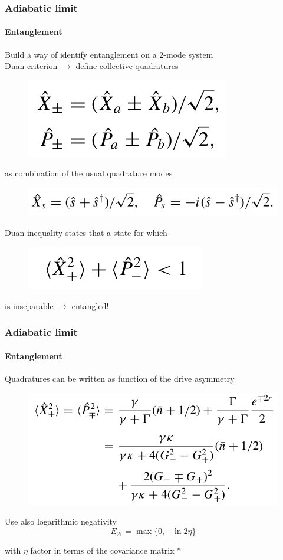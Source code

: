 \documentclass[aspectratio=43]{beamer}
\begin{document}
\begin{frame}
	
	\frametitle{Adiabatic limit}
	\framesubtitle{Entanglement}
	
	Build a way of identify entanglement on a 2-mode system\\
	Duan criterion $\longrightarrow$ define collective quadratures
	\begin{figure}
		\includegraphics[width = 4 cm]{plots/entanglement_quad.png}
	\end{figure}	
	
	as combination of the usual quadrature modes
	\begin{figure}
		\includegraphics[width = 7 cm]{plots/entanglement_quad_2.png}
	\end{figure}

	Duan inequality states that a state for which
	\begin{figure}
		\includegraphics[width = 3.5 cm]{plots/entanglement_duan_criterion.png}
	\end{figure}

	is inseparable $\longrightarrow$ {\color{blue}entangled!}

\end{frame}

\begin{frame}

	\frametitle{Adiabatic limit}
	\framesubtitle{Entanglement}
		
	Quadratures can be written as function of the drive asymmetry 
	\begin{figure}
		\includegraphics[width = 7.5 cm]{plots/entanglement_quadratures.png}
	\end{figure}

	Use also logarithmic negativity 
	\begin{equation}
		E_{\mathcal{N}} = \max \{0, -\ln 2\eta \} \nonumber
	\end{equation}

	with $\eta$ factor in terms of the covariance matrix {\color{blue}*}

\end{frame}
\end{document}
